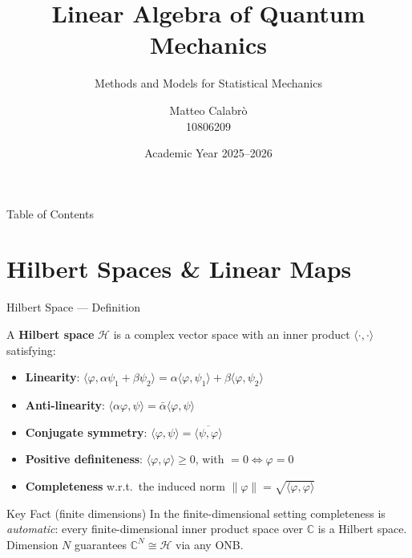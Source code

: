 \documentclass{beamer}
\title{Linear Algebra of Quantum Mechanics}
\subtitle{Methods and Models for Statistical Mechanics}
\author{Matteo Calabr\`o \\ \small{10806209}}
\institute{Politecnico di Milano \\ \smallskip \small{Advisor: Prof.\ Silvia Lorenzani}}
\date{Academic Year 2025--2026}
\newcommand{\Hilb}{\mathcal{H}}
\newcommand{\ip}[2]{\langle #1, #2 \rangle}
\newcommand{\norm}[1]{\|#1\|}
\begin{document}

\frame{\titlepage}

\begin{frame}{Table of Contents}
  \tableofcontents
\end{frame}

\section{Hilbert Spaces \& Linear Maps}

\begin{frame}[shrink=10]{Hilbert Space --- Definition}
  \small
  \begin{tcolorbox}[defbox, title={Definition}, left=3pt, right=3pt, top=2pt, bottom=2pt]
    A \textbf{Hilbert space} $\Hilb$ is a complex vector space with an inner product
    $\ip{\cdot}{\cdot}$ satisfying:
    \begin{itemize}\setlength\itemsep{1pt}
      \item \textbf{Linearity}: $\ip{\varphi}{\alpha\psi_1+\beta\psi_2}=\alpha\ip{\varphi}{\psi_1}+\beta\ip{\varphi}{\psi_2}$
      \item \textbf{Anti-linearity}: $\ip{\alpha\varphi}{\psi}=\bar\alpha\ip{\varphi}{\psi}$
      \item \textbf{Conjugate symmetry}: $\ip{\varphi}{\psi}=\overline{\ip{\psi}{\varphi}}$
      \item \textbf{Positive definiteness}: $\ip{\varphi}{\varphi}\ge 0$, with $=0 \Leftrightarrow \varphi=0$
      \item \textbf{Completeness} w.r.t.\ the induced norm $\norm{\varphi}=\sqrt{\ip{\varphi}{\varphi}}$
    \end{itemize}
  \end{tcolorbox}
  \begin{block}{Key Fact (finite dimensions)}
  \justifying
    In the finite-dimensional setting completeness is \emph{automatic}: every
    finite-dimensional inner product space over $\mathbb{C}$ is a Hilbert space.
    Dimension $N$ guarantees $\mathbb{C}^N \cong \Hilb$ via any ONB.
  \end{block}
\end{frame}
\end{document}
